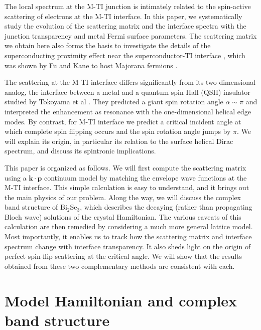 \documentclass[11pt]{report}
\begin{document}
The local spectrum at the M-TI junction is intimately related to the spin-active scattering of electrons at the M-TI interface. In this paper, we systematically study the evolution of the scattering matrix and the interface spectra
with the junction transparency and metal Fermi surface parameters. 
The scattering matrix \cite{mrs} we obtain here also forms the basis to investigate the details of the superconducting proximity effect near the superconductor-TI interface \cite{stan}, which was shown by Fu and Kane to host Majorana fermions \cite{majorana}.

The scattering at the M-TI interface differs significantly from its two dimensional analog, the interface between a metal and a quantum spin Hall (QSH) insulator studied by Tokoyama et al \cite{yokoyama09}. They predicted a giant spin rotation angle $\alpha\sim \pi$ and interpreted the enhancement as resonance with the one-dimensional helical edge modes. By contrast, for M-TI interface we predict a critical incident angle at which complete spin flipping occurs and the spin rotation angle jumps by $\pi$. We will explain its origin, {in particular its relation to the surface helical Dirac spectrum}, and discuss its spintronic implications.

This paper is organized as follows. 
We will first compute the scattering matrix using a $\mathbf{k\cdot p}$ continuum model 
by matching the envelope wave functions at the M-TI interface. This simple calculation is easy to understand, 
and it brings out
the main physics of our problem. Along the way, we will discuss the complex band structure of Bi$_2$Se$_3$,
 which describes the decaying (rather than propagating Bloch wave) solutions of the crystal Hamiltonian.
The various caveats of this calculation 
are then remedied by considering a much more general lattice model. Most importantly, it enables us to 
track how the scattering matrix and interface spectrum change with interface transparency. It also sheds light on
the origin of perfect spin-flip scattering at the critical angle.
We will show that the results obtained from these two complementary methods are consistent with each.

\section{Model Hamiltonian and complex band structure}
\end{document}
